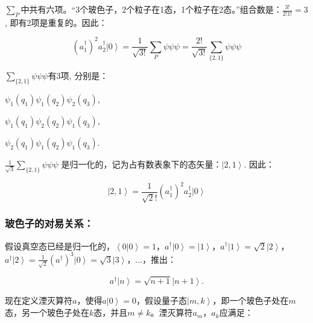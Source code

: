 $\sum\limits_P
{}$中共有六项。“3个玻色子，2个粒子在1态，1个粒子在2态。”组合数是：$\frac{3!}{2!1!}
= 3$, 即有2项是重复的。因此：

\begin{equation*}
\left( {a_1^\dag  } \right)^2 a_2^\dag  \left| 0 \right\rangle =
\frac{1} {{\sqrt {3!} }}\sum\limits_P {\psi \psi \psi }  =
\frac{{2!}} {{\sqrt {3!} }}\sum\limits_{\{ 2,1\} } {\psi \psi \psi }
\end{equation*}


$\sum\limits_{\{ 2,1\} } {\psi \psi \psi }$有3项, 分别是：

\begin{center}

$\psi_1(q_1)\psi_1(q_2)\psi_2(q_3)$,

$\psi_1(q_1)\psi_2(q_2)\psi_1(q_3)$,

$\psi_2(q_1)\psi_1(q_2)\psi_1(q_3)$.

\end{center}

$\frac{1}{\sqrt 3}\sum\limits_{\{ 2,1\} } {\psi \psi \psi }$
是归一化的，记为占有数表象下的态矢量：$\left| 2,1 \right\rangle$.
因此：

\begin{equation*}
\left| 2,1 \right\rangle = \frac{1}{\sqrt 2!} \left( {a_1^\dag  }
\right)^2 a_2^\dag  \left| 0 \right\rangle
\end{equation*}

\subsubsection{玻色子的对易关系：}

假设真空态已经是归一化的，$\left\langle 0 \right.\left| 0
\right\rangle  = 1$，$a^\dag  \left| 0 \right\rangle  = \left| 1
\right\rangle$，$a^\dag  \left| 1 \right\rangle  = \sqrt 2 \left| 2
\right\rangle$，$a^\dag  \left| 2 \right\rangle  = \frac{1}{{\sqrt 2
}}\left( {a^\dag  } \right)^3 \left| 0 \right\rangle  = \sqrt 3
\left| 3 \right\rangle $，...，推出：

\begin{equation}\label{boson recursion creat}
a^\dag  \left| n \right\rangle  = \sqrt {n + 1} \left| {n + 1}
\right\rangle .
\end{equation}


现在定义湮灭算符$a$，使得$a \left| 0 \right\rangle =
0$，假设量子态$\left| {m,k}
\right\rangle$，即一个玻色子处在$m$态，另一个玻色子处在$k$态，并且$m \ne k$。湮灭算符$a_m$，$a_k$应满足：

